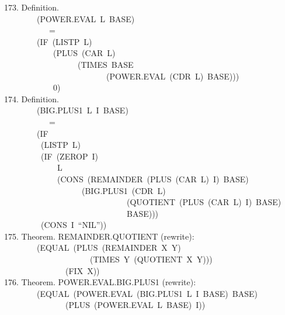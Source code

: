 \documentclass[10pt]{book}
\newenvironment{pubasis}{\begin{flushleft}}{\end{flushleft}}
\begin{document}
\begin{pubasis}
173.    Definition.\\
~~~~~~~~(POWER.EVAL~L~BASE)\\
~~~~~~~~~~~=\\
~~~~~~~~(IF~(LISTP~L)\\
~~~~~~~~~~~~(PLUS~(CAR~L)\\
~~~~~~~~~~~~~~~~~~(TIMES~BASE\\
~~~~~~~~~~~~~~~~~~~~~~~~~(POWER.EVAL~(CDR~L)~BASE)))\\
~~~~~~~~~~~~0)\\

174.    Definition.\\
~~~~~~~~(BIG.PLUS1~L~I~BASE)\\
~~~~~~~~~~~=\\
~~~~~~~~(IF\\
~~~~~~~~~(LISTP~L)\\
~~~~~~~~~(IF~(ZEROP~I)\\
~~~~~~~~~~~~~L\\
~~~~~~~~~~~~~(CONS~(REMAINDER~(PLUS~(CAR~L)~I)~BASE)\\
~~~~~~~~~~~~~~~~~~~(BIG.PLUS1~(CDR~L)\\
~~~~~~~~~~~~~~~~~~~~~~~~~~~~~~(QUOTIENT~(PLUS~(CAR~L)~I)~BASE)\\
~~~~~~~~~~~~~~~~~~~~~~~~~~~~~~BASE)))\\
~~~~~~~~~(CONS~I~``NIL''))\\

175.    Theorem.  REMAINDER.QUOTIENT (rewrite):\\
~~~~~~~~(EQUAL~(PLUS~(REMAINDER~X~Y)\\
~~~~~~~~~~~~~~~~~~~~~(TIMES~Y~(QUOTIENT~X~Y)))\\
~~~~~~~~~~~~~~~(FIX~X))\\

176.    Theorem.  POWER.EVAL.BIG.PLUS1 (rewrite):\\
~~~~~~~~(EQUAL~(POWER.EVAL~(BIG.PLUS1~L~I~BASE)~BASE)\\
~~~~~~~~~~~~~~~(PLUS~(POWER.EVAL~L~BASE)~I))\\


\end{pubasis}
\end{document}
